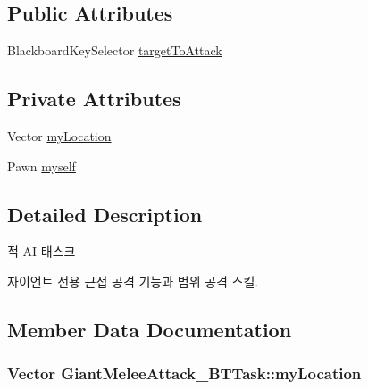 \subsection*{Public Attributes}
\begin{DoxyCompactItemize}
\item 
Blackboard\+Key\+Selector \hyperlink{class_giant_melee_attack___b_t_task_ace477d8d2d2c02e1ae5220e36e60b6ac}{target\+To\+Attack}
\end{DoxyCompactItemize}
\subsection*{Private Attributes}
\begin{DoxyCompactItemize}
\item 
Vector \hyperlink{class_giant_melee_attack___b_t_task_a6d7cb8d701fc5a62d10180592a1727bf}{my\+Location}
\item 
Pawn \hyperlink{class_giant_melee_attack___b_t_task_a30dd53d02e844eab55652c2fc628b53c}{myself}
\end{DoxyCompactItemize}


\subsection{Detailed Description}
적 AI 태스크 

자이언트 전용 근접 공격 기능과 범위 공격 스킬. 

\subsection{Member Data Documentation}
\subsubsection[{\texorpdfstring{my\+Location}{myLocation}}]{\setlength{\rightskip}{0pt plus 5cm}Vector Giant\+Melee\+Attack\+\_\+\+B\+T\+Task\+::my\+Location\hspace{0.3cm}{\ttfamily [private]}}\hypertarget{class_giant_melee_attack___b_t_task_a6d7cb8d701fc5a62d10180592a1727bf}{}\label{class_giant_melee_attack___b_t_task_a6d7cb8d701fc5a62d10180592a1727bf}
